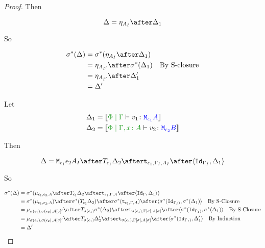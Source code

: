 \documentclass{report}
\begin{document}
\begin{framed}
\begin{proof}
    Then
    
    \begin{equation}
        \D = \point{A_I}\after \D_1\\
    \end{equation}
    
    So
    
    \begin{align*}
        \si\star(\D) &= \si\star(\point{A_I}\after \D_1)\\
                & = \point{A_{I'}} \after\si\star(\D_1)\qt{By S-closure}\\
                & = \point{A_{I'}} \after\D_1'\\
                & = \D'
    \end{align*}
    
    Let \begin{align*}
        \D_1 &= \deno{\gpetyperelation{v_1}{\M{\e_1}{A}}}\\
        \D_2 &= \deno{\etyperelation{\P}{\gax}{v_2}{\M{\e_2}{B}}}
    \end{align*}
    
    Then
    
    \begin{equation}
        \D = \M{\e_1}{\e_2}{A_I}\after\T{\e_1}{\D_2}\after\tstrength{\e_1}{\G_I}{A_I}\after\pr{\Id{\G_{I}}}{\D_1}\\
    \end{equation}
    
    So
    
    \begin{align*}
        \si\star(\D) &= \si\star(\bind{\e_1}{\e_2}{A}\after\T{\e_1}{\D_2}\after\tstrength{\e_1}{\G}{A}\after\pr{\Id{\G}}{\D_1})\\
        & = \si\star(\bind{\e_1}{\e_2}{A})\after\si\star(\T{\e_1}{\D_2})\after\si\star(\tstrength{\e_1}{\G}{A})\after\pr{\si\star(\Id{\G_{I})}}{\si\star(\D_1)}\qt{By S-Closure}\\
        &= \bind{\si(\e_1)}{\si(\e_2)}{A\ssi'}\after\T{\si(\e_1)}{\si\star(\D_2)}\after\tstrength{\si(\e_1)}{\G\ssi}{A\ssi}\after\pr{\si\star(\Id{\G_{I})}}{\si\star(\D_1)}\qt{By S-Closure}\\
        &= \bind{\si(\e_1)}{\si(\e_2)}{A\ssi'}\after\T{\si(\e_1)}{\D_2'}\after\tstrength{\si(\e_1)}{\G\ssi}{A\ssi}\after\pr{\si\star(\Id{\G_{I})}}{\D_1'}\qt{By Induction}\\
        &= \D'\\
    \end{align*}
    

\end{proof}
\end{framed}
\end{document}
